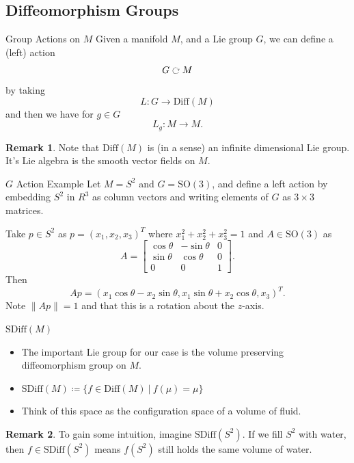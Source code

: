\documentclass[usenames,dvipsnames]{beamer}
\theoremstyle{definition}
\newtheorem*{remark}{Remark}
\theoremstyle{theorem}
\begin{document}
    \subsection{Diffeomorphism Groups}
        \begin{frame}{Group Actions on $M$}
           Given a manifold $M$, and a Lie group $G$, we can define a (left) action 
           \[
           G\ \rotatebox[origin=c]{-90}{$\circlearrowright$}\ M
           \]
           by taking 
           \[
           L \colon G \to \textrm{Diff}(M)
           \]
           and then we have for $g\in G$
           \[
           L_g \colon M \to M.
           \]
           \begin{remark}
            Note that $\textrm{Diff}(M)$ is (in a sense) an infinite dimensional Lie group. It's Lie algebra is the smooth vector fields on $M$.
           \end{remark}
        \end{frame}
        
        \begin{frame}{$G$ Action Example}
            Let $M=S^2$ and $G=\textrm{SO}(3)$, and define a left action by embedding $S^2$ in $R^3$ as column vectors and writing elements of $G$ as $3\times 3$ matrices.
            
            Take $p\in S^2$ as $p=(x_1,x_2,x_3)^T$ where $x_1^2+x_2^2+x_3^2=1$ and $A \in \textrm{SO}(3)$ as
            \[A =
            \begin{bmatrix}
            \cos \theta & -\sin \theta & 0\\
            \sin \theta & \cos \theta & 0 \\
            0 & 0 & 1
            \end{bmatrix}.
            \]
            Then
            \[
            Ap = (x_1 \cos \theta - x_2 \sin \theta, x_1 \sin \theta + x_2 \cos \theta, x_3)^T. 
            \]
            Note $\|Ap\|=1$ and that this is a rotation about the $z$-axis.
        \end{frame}
        
        \begin{frame}{$\textrm{SDiff}(M)$}
            \begin{itemize}
                \item The important Lie group for our case is the volume preserving diffeomorphism group on $M$.
                \item $\mathrm{SDiff}(M)\coloneqq \{ f\in \mathrm{Diff}(M) ~\vert~ f(\mu)=\mu\}$
                \item Think of this space as the configuration space of a volume of fluid.
            \end{itemize}
            \begin{remark}
                To gain some intuition, imagine $\mathrm{SDiff}(S^2).$ If we fill $S^2$ with water, then $f\in \mathrm{SDiff}(S^2)$ means $f(S^2)$ still holds the same volume of water.
            \end{remark}
        \end{frame}
        
\end{document}
